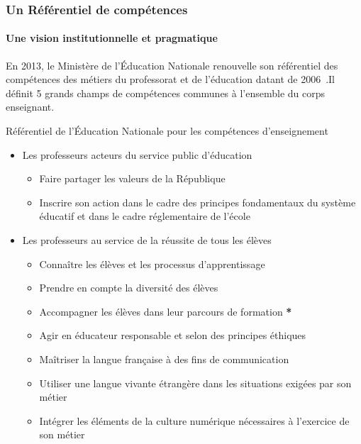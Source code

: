         \subsubsection{Un Référentiel de compétences}
            \paragraph{Une vision institutionnelle et pragmatique}
                En 2013, le Ministère de l'Éducation Nationale renouvelle son référentiel des compétences des métiers du professorat et de l'éducation datant de 2006~.Il définit 5 grands champs de compétences communes à l'ensemble du corps enseignant.
                \begin{table}[!h]
                \caption[Référentiel des compétences d'enseignement]{Référentiel de l'Éducation Nationale pour les compétences d'enseignement~}
                \begin{itemize}\myItemStyle
                \item Les professeurs acteurs du service public d'éducation
                    \begin{itemize}
                    \item  Faire partager les valeurs de la République
                    \item  Inscrire son action dans le cadre des principes fondamentaux du système éducatif et dans le cadre réglementaire de l'école
                    \end{itemize}
                \item Les professeurs au service de la réussite de tous les élèves
                    \begin{itemize}
                    \item Connaître les élèves et les processus d'apprentissage
                    \item Prendre en compte la diversité des élèves
                    \item Accompagner les élèves dans leur parcours de formation \textbf{*}
                    \item Agir en éducateur responsable et selon des principes éthiques
                    \item Maîtriser la langue française à des fins de communication
                    \item Utiliser une langue vivante étrangère dans les situations exigées par son métier
                    \item Intégrer les éléments de la culture numérique nécessaires à l'exercice de son métier
                    \end{itemize}{}
                \end{itemize}
                \label{tab:BO-ref-prof}
                \end{table}
